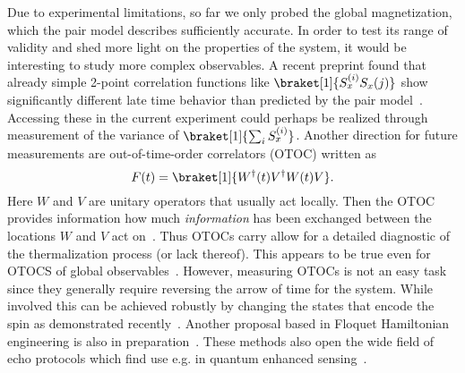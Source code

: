Due to experimental limitations, so far we only probed the global magnetization, which the pair model describes sufficiently accurate. In order to test its range of validity and shed more light on the properties of the system, it would be interesting to study more complex observables. A recent preprint found that already simple 2-point correlation functions like $\braket[1]{S_x^{(i)}S_x{(j)}}$ show significantly different late time behavior than predicted by the pair model~\cite{mukherjeeInfluenceDisorderedAnisotropic2024}. Accessing these in the current experiment could perhaps be realized through measurement of the variance of $\braket[1]{\sum_i S_x^{(i)}}$.
Another direction for future measurements are out-of-time-order correlators (OTOC) written as
\begin{equation}
	F(t) = \braket[1]{W^\dagger(t)V^\dagger W(t)V}.
\end{equation}
Here $W$ and $V$ are unitary operators that usually act locally. Then the OTOC provides information how much \emph{information} has been exchanged between the locations $W$ and $V$ act on~\cite{chenOutTimeOrder2017,swingleUnscramblingPhysicsOutoftimeorder2018,luitzEmergentLocalitySystems2019,xuScramblingDynamicsOutofTimeOrdered2024}. Thus OTOCs carry allow for a detailed diagnostic of the thermalization process (or lack thereof). This appears to be true even for OTOCS of global observables~\cite{lozano-negroGlobalOutTime2024}. However, measuring OTOCs is not an easy task since they generally require reversing the arrow of time for the system. While involved this can be achieved robustly by changing the states that encode the spin as demonstrated recently~\cite{geierTimereversalDipolarQuantum2024}. Another proposal based in Floquet Hamiltonian engineering is also in preparation~\cite{muellenbachOTOC}. 
These methods also open the wide field of echo protocols which find use e.g. in quantum enhanced sensing~\cite{davisApproachingHeisenbergLimit2016,linnemannQuantumEnhancedSensingBased2016,colomboTimereversalbasedQuantumMetrology2022}.

